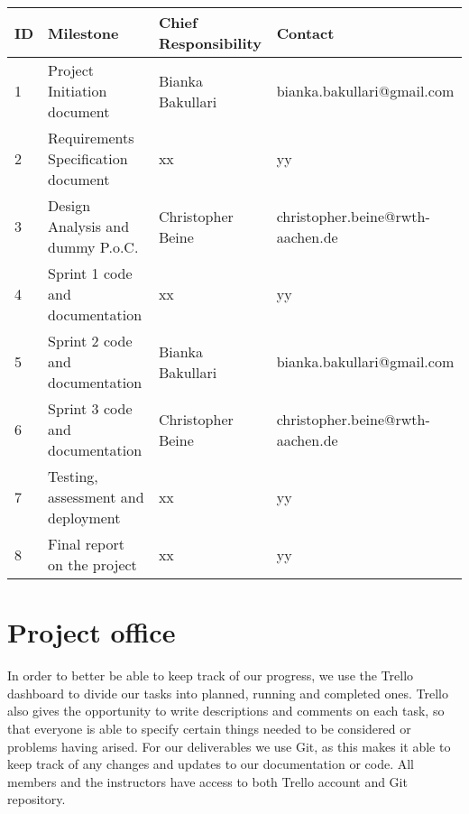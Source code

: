 \documentclass[notitlepage]{article}
\begin{document}
\begin{flushleft}
\begin{center}
  \begin{tabular}{ m{0.4cm} m{5cm} m{5cm} m{6cm} }
  	\hline
		ID & Milestone & Chief Responsibility & Contact \\ \hline
		1 & Project Initiation document & Bianka Bakullari & bianka.bakullari@gmail.com \\ \hline
		2 & Requirements Specification document & xx & yy \\ \hline
		3 & Design Analysis and dummy P.o.C. & Christopher Beine & christopher.beine@rwth-aachen.de \\ \hline
		4 & Sprint 1 code and documentation & xx  & yy \\ \hline
		5 & Sprint 2 code and documentation & Bianka Bakullari & bianka.bakullari@gmail.com \\ \hline
		6 & Sprint 3 code and documentation & Christopher Beine & christopher.beine@rwth-aachen.de \\ \hline
		7 & Testing, assessment and deployment & xx & yy \\ \hline
		8 & Final report on the project & xx & yy \\ \hline
	\end{tabular}
\end{center}













\section{Project office}

In order to better be able to keep track of our progress, we use the Trello dashboard to divide our tasks into planned, running and completed ones.
Trello also gives the opportunity to write descriptions and comments on each task, so that everyone is able to specify certain things needed to be considered or problems having arised.
For our deliverables we use Git, as this makes it able to keep track of any changes and updates to our documentation or code.
All members and the instructors have access to both Trello account and Git repository.

%
%  




\end{flushleft}
%
\end{document}
